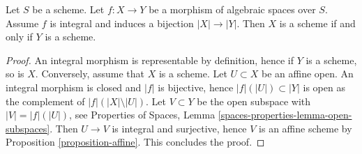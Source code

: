 \begin{lemma}
\label{lemma-integral-universally-bijective-scheme}
Let $S$ be a scheme. Let $f : X \to Y$ be a morphism of algebraic spaces
over $S$. Assume $f$ is integral and induces a bijection $|X| \to |Y|$.
Then $X$ is a scheme if and only if $Y$ is a scheme.
\end{lemma}

\begin{proof}
An integral morphism is representable by definition, hence if $Y$
is a scheme, so is $X$. Conversely, assume that $X$ is a scheme.
Let $U \subset X$ be an affine open. An integral morphism is
closed and $|f|$ is bijective, hence $|f|(|U|) \subset |Y|$
is open as the complement of $|f|(|X| \setminus |U|)$. Let
$V \subset Y$ be the open subspace with $|V| = |f|(|U|)$, see
Properties of Spaces, Lemma \ref{spaces-properties-lemma-open-subspaces}.
Then $U \to V$ is integral and surjective, hence
$V$ is an affine scheme by Proposition \ref{proposition-affine}.
This concludes the proof.
\end{proof}

















